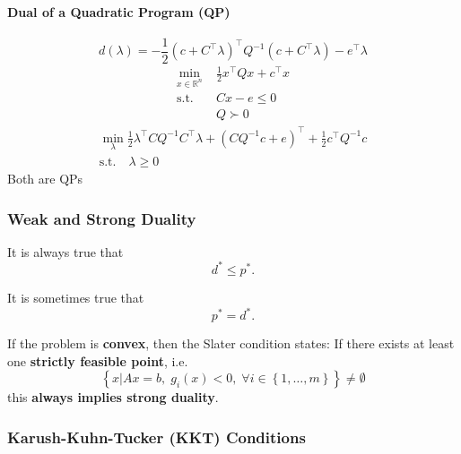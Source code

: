 \paragraph{Dual of a Quadratic Program (QP)}
\noindent
\begin{equation*}
    d(\lambda) = -\frac{1}{2}{\left(c+C^\top\lambda\right)}^\top Q^{-1}\left(c+C^\top\lambda\right) -e^\top\lambda
\end{equation*}
\begin{align*}
    \min_{x\in\mathbb{R}^n} & \frac{1}{2}x^\top Qx + c^\top x \\
    \text{s.t.}\quad        & Cx-e \leq 0                     \\
                            & Q \succ 0
\end{align*}
\begin{gather*}
    \min_{\lambda} \frac{1}{2}\lambda^\top C Q^{-1}C^\top\lambda+{\left(CQ^{-1}c+e\right)}^\top + \frac{1}{2}c^\top Q^{-1}c \\
    \text{s.t.}\quad \lambda \geq 0
\end{gather*}
Both are QPs

\subsubsection{Weak and Strong Duality}


It is always true that
\begin{equation*}
    d^* \leq p^*.
\end{equation*}

\newpar{}

It is sometimes true that
\begin{equation*}
    p^* = d^*.
\end{equation*}

\newpar{}

If the problem is \textbf{convex}, then the Slater condition states:
\newpar{}
If there exists at least one \textbf{strictly feasible point}, i.e.
\begin{equation*}
    \left\{x | Ax = b,\; g_i(x) < 0,\; \forall i \in \left\{1, \ldots, m\right\}\right\} \neq \emptyset
\end{equation*}
this \textbf{always implies strong duality}.

\subsubsection{Karush-Kuhn-Tucker (KKT) Conditions}

